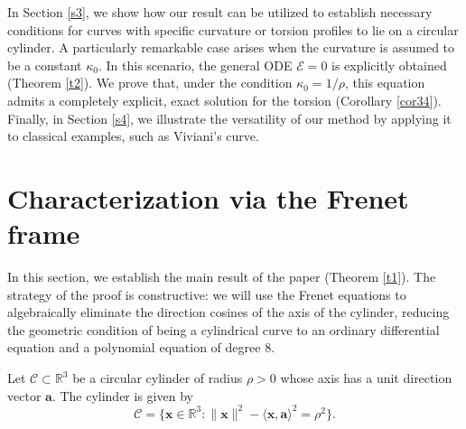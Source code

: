 \documentclass[a4paper,12pt]{amsart}
\theoremstyle{plain}
\theoremstyle{definition}
\newcommand{\bfa}{\mathbf{a}}
\def\cy{\mathcal C}
\def\r{\mathbb R}
\begin{document}
In Section \ref{s3}, we show how our result can be utilized to establish necessary conditions for curves with specific curvature or torsion profiles to lie on a circular cylinder. A particularly remarkable case arises when the curvature is assumed to be a constant $\kappa_0$.  In this scenario, the general ODE $\mathcal{E}=0$ is explicitly obtained (Theorem \ref{t2}).   We prove that, under the     condition $\kappa_0 = 1/\rho$, this equation   admits a completely explicit, exact   solution for the torsion (Corollary \ref{cor34}). Finally, in Section \ref{s4}, we illustrate the versatility of our method by applying it to classical examples, such as Viviani's curve.


 

\section{Characterization via the Frenet frame}\label{sec2}

In this section, we establish the main result of the paper (Theorem \ref{t1}). The strategy of the proof is constructive: we will use the Frenet equations to algebraically eliminate the direction cosines of the axis of the cylinder,  reducing the geometric condition of being a cylindrical curve to an ordinary differential equation and a polynomial equation of degree $8$.


Let $\cy\subset\r^3$ be a circular cylinder of radius $\rho>0$   whose axis has a unit direction vector $\bfa$. The cylinder is given by
\begin{equation}\label{eq00}
    \cy = \{\mathbf{x}\in\r^3\colon \|\mathbf{x}\|^2-  \langle \mathbf{x},\bfa\rangle^2 =  \rho^2\}.
\end{equation}
\end{document}
